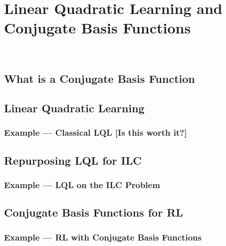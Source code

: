 \section{Linear Quadratic Learning and Conjugate Basis Functions}
~\label{sec:lql_and_conj}

\subsection{What is a Conjugate Basis Function}

\subsection{Linear Quadratic Learning}

\subsubsection{Example --- Classical LQL [Is this worth it?]}

\subsection{Repurposing LQL for ILC}

\subsubsection{Example --- LQL on the ILC Problem}

\subsection{Conjugate Basis Functions for RL}

\subsubsection{Example --- RL with Conjugate Basis Functions}

